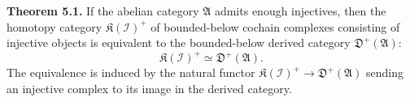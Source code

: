 \textbf{Theorem 5.1.} If the abelian category $\mathfrak{A}$ admits enough injectives, then the homotopy category $\mathfrak{K}(\mathcal{I})^{+}$ of bounded-below cochain complexes consisting of injective objects is equivalent to the bounded-below derived category $\mathfrak{D}^{+}(\mathfrak{A})$:
$$
\mathfrak{K}(\mathcal{I})^{+} \simeq \mathfrak{D}^{+}(\mathfrak{A}).
$$
The equivalence is induced by the natural functor $\mathfrak{K}(\mathcal{I})^{+} \to \mathfrak{D}^{+}(\mathfrak{A})$ sending an injective complex to its image in the derived category.
